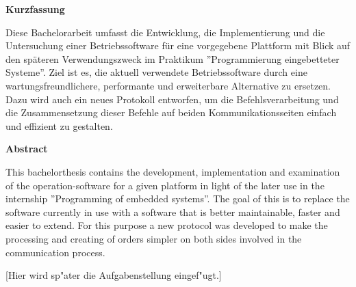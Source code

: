 \documentclass[11pt,twoside]{scrbook}
\begin{document}

\centerline{\bf Kurzfassung}

Diese Bachelorarbeit umfasst die Entwicklung, die Implementierung und die Untersuchung einer
Betriebssoftware für eine vorgegebene Plattform mit Blick auf den späteren Verwendungszweck
im Praktikum ''Programmierung eingebetteter Systeme''. Ziel ist es, die aktuell verwendete
Betriebssoftware durch eine wartungsfreundlichere, performante und erweiterbare Alternative zu
ersetzen. Dazu wird auch ein neues Protokoll entworfen, um die Befehlsverarbeitung und
die Zusammensetzung dieser Befehle auf beiden Kommunikationsseiten einfach und effizient
zu gestalten.

%
\vskip 3cm
%

\centerline{\bf Abstract}

This bachelorthesis contains the development, implementation and examination of the
operation-software for a given platform in light of the later use in the internship
''Programming of embedded systems''. The goal of this is to replace the software
currently in use with a software that is better maintainable, faster and easier to
extend. For this purpose a new protocol was developed to make the processing and
creating of orders simpler on both sides involved in the communication process.

\cleardoublepage

\vspace*{7cm}
\centerline{[Hier wird sp"ater die Aufgabenstellung eingef"ugt.]}




\tableofcontents		%
\cleardoublepage
\listoffigures			%
\cleardoublepage
\listoftables			%
\cleardoublepage



\setcounter{page}{0}

\pagestyle{headings}



\cleardoublepage


\cleardoublepage


\cleardoublepage


\cleardoublepage


\cleardoublepage


\cleardoublepage


\cleardoublepage



\cleardoublepage

\begin{appendix}

\cleardoublepage

\end{appendix}
\end{document}
